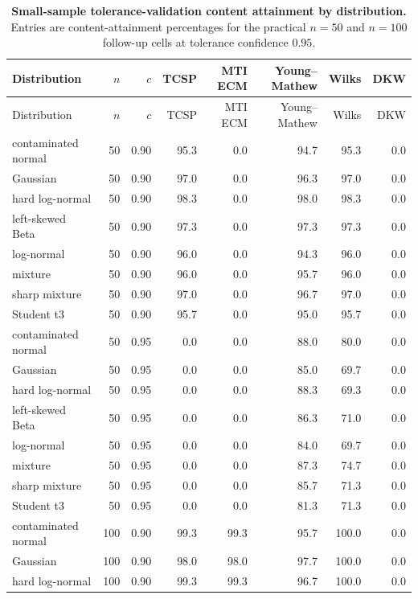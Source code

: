 \begin{longtable}{@{}p{}rrrrrrr@{}}
\caption{\textbf{Small-sample tolerance-validation content attainment by distribution.} Entries are content-attainment percentages for the practical \(n=50\) and \(n=100\) follow-up cells at tolerance confidence \(0.95\).}\label{tab:supp-small-sample-dgp-delivery}\\
\toprule
Distribution & \(n\) & \(c\) & TCSP & MTI ECM & Young--Mathew & Wilks & DKW
\\
\midrule
\endfirsthead
\toprule
Distribution & \(n\) & \(c\) & TCSP & MTI ECM & Young--Mathew & Wilks & DKW
\\
\midrule
\endhead
contaminated normal & 50 & 0.90 & 95.3 & 0.0 & 94.7 & 95.3 & 0.0
\\
Gaussian & 50 & 0.90 & 97.0 & 0.0 & 96.3 & 97.0 & 0.0
\\
hard log-normal & 50 & 0.90 & 98.3 & 0.0 & 98.0 & 98.3 & 0.0
\\
left-skewed Beta & 50 & 0.90 & 97.3 & 0.0 & 97.3 & 97.3 & 0.0
\\
log-normal & 50 & 0.90 & 96.0 & 0.0 & 94.3 & 96.0 & 0.0
\\
mixture & 50 & 0.90 & 96.0 & 0.0 & 95.7 & 96.0 & 0.0
\\
sharp mixture & 50 & 0.90 & 97.0 & 0.0 & 96.7 & 97.0 & 0.0
\\
Student t3 & 50 & 0.90 & 95.7 & 0.0 & 95.0 & 95.7 & 0.0
\\
contaminated normal & 50 & 0.95 & 0.0 & 0.0 & 88.0 & 80.0 & 0.0
\\
Gaussian & 50 & 0.95 & 0.0 & 0.0 & 85.0 & 69.7 & 0.0
\\
hard log-normal & 50 & 0.95 & 0.0 & 0.0 & 88.3 & 69.3 & 0.0
\\
left-skewed Beta & 50 & 0.95 & 0.0 & 0.0 & 86.3 & 71.0 & 0.0
\\
log-normal & 50 & 0.95 & 0.0 & 0.0 & 84.0 & 69.7 & 0.0
\\
mixture & 50 & 0.95 & 0.0 & 0.0 & 87.3 & 74.7 & 0.0
\\
sharp mixture & 50 & 0.95 & 0.0 & 0.0 & 85.7 & 71.3 & 0.0
\\
Student t3 & 50 & 0.95 & 0.0 & 0.0 & 81.3 & 71.3 & 0.0
\\
contaminated normal & 100 & 0.90 & 99.3 & 99.3 & 95.7 & 100.0 & 0.0
\\
Gaussian & 100 & 0.90 & 98.0 & 98.0 & 97.7 & 100.0 & 0.0
\\
hard log-normal & 100 & 0.90 & 99.3 & 99.3 & 96.7 & 100.0 & 0.0
\\

\end{longtable}
